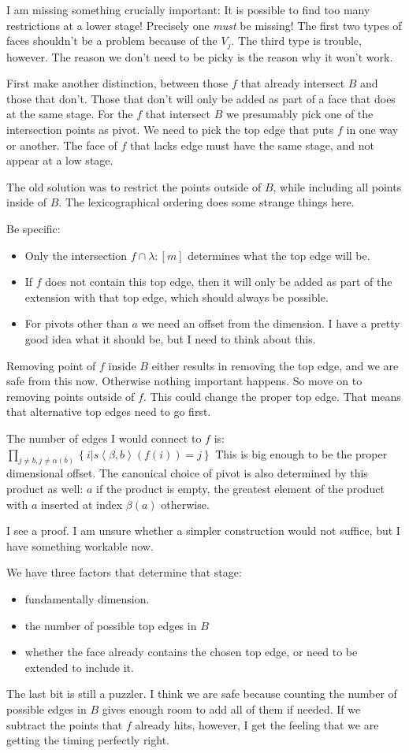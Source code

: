 \documentclass{tac}
\newcommand\set[1]{\left\{#1\right\}}
\newcommand\of{:}
\newcommand\tuplet[1]{\left\langle #1 \right\rangle}
\begin{document}
I am missing something crucially important:
It is possible to find too many restrictions at a lower stage!
Precisely one \emph{must} be missing! The first two types of faces shouldn't be a problem because of the $V_j$.
The third type is trouble, however. The reason we don't need to be picky
is the reason why it won't work.

First make another distinction, between those $f$ that already intersect $B$ and those that don't. Those that don't will only be added as part of a face that does at the same stage. For the $f$ that intersect $B$ we presumably pick one of the intersection points as pivot.
We need to pick the top edge that puts $f$ in one way or another. The face of $f$ that lacks edge must have the same stage, and not appear at a low stage.

The old solution was to restrict the points outside of $B$, while including all points inside of $B$. The lexicographical ordering does some strange things here.

Be specific:
\begin{itemize} 
\item Only the intersection $f \cap \lambda\of [m]$ determines what the top edge will be.
\item If $f$ does not contain this top edge, then it will only be added as part of the extension with that top edge, which should always be possible.
\item For pivots other than $a$ we need an offset from the dimension. I have a pretty good idea what it should be, but I need to think about this.
\end{itemize}
Removing point of $f$ inside $B$ either results in removing the top edge, and we are safe from this now. Otherwise nothing important happens. So move on to removing points outside of $f$. This could change the proper top edge. That means that alternative top edges need to go first.

The number of edges I would connect to $f$ is:
$\prod_{j\neq b, j\neq \alpha(b)}\set{i|s\tuplet{\beta,b}(f(i)) = j}$
This is big enough to be the proper dimensional offset.
The canonical choice of pivot is also determined by this product as well: $a$ if the product is empty, the greatest element of the product with $a$ inserted at index $\beta(a)$ otherwise.

I see a proof. I am unsure whether a simpler construction would not suffice, but I have something workable now.

We have three factors that determine that stage:
\begin{itemize}
\item fundamentally dimension.
\item the number of possible top edges in $B$
\item whether the face already contains the chosen top edge, or need to be extended to include it.
\end{itemize}
The last bit is still a puzzler. I think we are safe because counting the number of possible edges in $B$ gives enough room to add all of them if needed. If we subtract the points that $f$ already hits, however, I get the feeling that we are getting the timing perfectly right.
\end{document}
